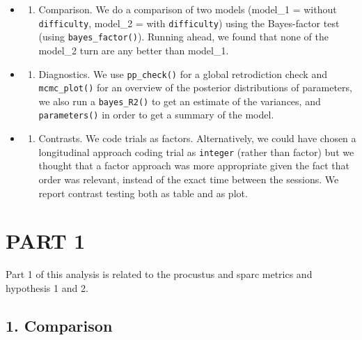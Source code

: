 \documentclass[
]{article}
\providecommand{\tightlist}{%
  \setlength{\itemsep}{0pt}\setlength{\parskip}{0pt}}
\begin{document}
\begin{itemize}
\item
  \begin{enumerate}
  \def\labelenumi{\arabic{enumi}.}
  \tightlist
  \item
    Comparison. We do a comparison of two models (model\_1 = without
    \texttt{difficulty}, model\_2 = with \texttt{difficulty}) using the
    Bayes-factor test (using \texttt{bayes\_factor()}). Running ahead,
    we found that none of the model\_2 turn are any better than
    model\_1.
  \end{enumerate}
\item
  \begin{enumerate}
  \def\labelenumi{\arabic{enumi}.}
  \setcounter{enumi}{1}
  \tightlist
  \item
    Diagnostics. We use \texttt{pp\_check()} for a global retrodiction
    check and \texttt{mcmc\_plot()} for an overview of the posterior
    distributions of parameters, we also run a \texttt{bayes\_R2()} to
    get an estimate of the variances, and \texttt{parameters()} in order
    to get a summary of the model.
  \end{enumerate}
\item
  \begin{enumerate}
  \def\labelenumi{\arabic{enumi}.}
  \setcounter{enumi}{2}
  \tightlist
  \item
    Contrasts. We code trials as factors. Alternatively, we could have
    chosen a longitudinal approach coding trial as \texttt{integer}
    (rather than factor) but we thought that a factor approach was more
    appropriate given the fact that order was relevant, instead of the
    exact time between the sessions. We report contrast testing both as
    table and as plot.
  \end{enumerate}
\end{itemize}

\hypertarget{part-1}{%
\section{PART 1}\label{part-1}}

Part 1 of this analysis is related to the procustus and sparc metrics
and hypothesis 1 and 2.

\hypertarget{comparison}{%
\subsection{1. Comparison}\label{comparison}}
\end{document}
